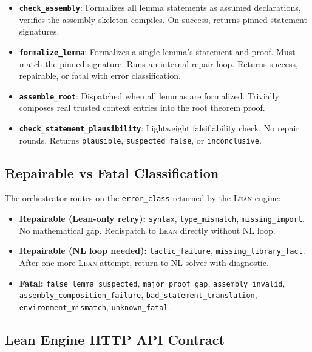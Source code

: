 \documentclass[11pt,a4paper]{article}
\newcommand{\Lean}{\textsc{Lean}}
\begin{document}
\begin{itemize}[leftmargin=2em]
  \item \textbf{\texttt{check\_assembly}}: Formalizes all lemma statements as assumed declarations, verifies the assembly skeleton compiles. On success, returns pinned statement signatures.
  \item \textbf{\texttt{formalize\_lemma}}: Formalizes a single lemma's statement and proof. Must match the pinned signature. Runs an internal repair loop. Returns success, repairable, or fatal with error classification.
  \item \textbf{\texttt{assemble\_root}}: Dispatched when all lemmas are formalized. Trivially composes real trusted context entries into the root theorem proof.
  \item \textbf{\texttt{check\_statement\_plausibility}}: Lightweight falsifiability check. No repair rounds. Returns \texttt{plausible}, \texttt{suspected\_false}, or \texttt{inconclusive}.
\end{itemize}

\subsection{Repairable vs Fatal Classification}

The orchestrator routes on the \texttt{error\_class} returned by the \Lean{} engine:

\begin{itemize}[leftmargin=2em]
  \item \textbf{Repairable (Lean-only retry):} \texttt{syntax}, \texttt{type\_mismatch}, \texttt{missing\_import}. No mathematical gap. Redispatch to \Lean{} directly without NL loop.
  \item \textbf{Repairable (NL loop needed):} \texttt{tactic\_failure}, \texttt{missing\_library\_fact}. After one more \Lean{} attempt, return to NL solver with diagnostic.
  \item \textbf{Fatal:} \texttt{false\_lemma\_suspected}, \texttt{major\_proof\_gap}, \texttt{assembly\_invalid}, \texttt{assembly\_composition\_failure}, \texttt{bad\_statement\_translation}, \texttt{environment\_mismatch}, \texttt{unknown\_fatal}.
\end{itemize}

\subsection{Lean Engine HTTP API Contract}
\label{sec:lean_api}
\end{document}
